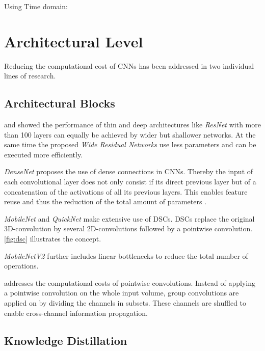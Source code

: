  Using Time domain:
 \cite{Chen2018}
 
 
\section{Architectural Level}

Reducing the computational cost of \acp{CNN} has been addressed in two individual lines of research.

\subsection{Architectural Blocks}

\cite{YoungwanLee} and \cite{Zagoruyko2016} showed the performance of thin and deep architectures like \textit{ResNet} with more than 100 layers can equally be achieved by wider but shallower networks. At the same time the proposed \textit{Wide Residual Networks} use less parameters and can be executed more efficiently.

\textit{DenseNet} \cite{Huang2016} proposes the use of dense connections in \acp{CNN}. Thereby the input of each convolutional layer does not only consist if its direct previous layer but of a concatenation of the activations of all its previous layers. This enables feature reuse  and thus the reduction of the total amount of parameters .

\textit{MobileNet} \cite{Howard2017} and \textit{QuickNet} \cite{Ghosh2017} make extensive use of \acp{DSC}. \acp{DSC} replace the original 3D-convolution by several 2D-convolutions followed by a pointwise convolution. \autoref{fig:dsc} illustrates the concept.

\textit{MobileNetV2} \cite{Sandler2018} further includes linear bottlenecks to reduce the total number of operations.

\cite{Zhang2017a} addresses the computational costs of pointwise convolutions. Instead of applying a pointwise convolution on the whole input volume, group convolutions are applied on by dividing the channels in subsets. These channels are shuffled to enable cross-channel information propagation. 

\subsection{Knowledge Distillation}

